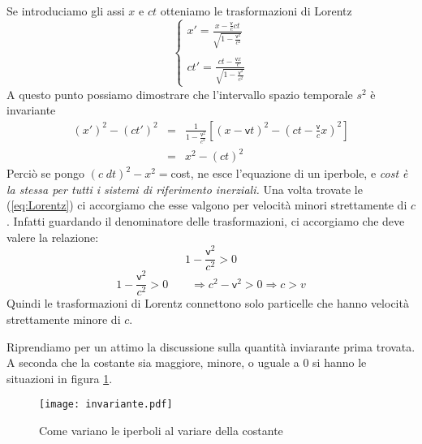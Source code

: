 Se introduciamo gli assi $x$ e $ct$ otteniamo le trasformazioni di
Lorentz 
\begin{equation}
  \left\{\begin{array}{l}
      x'=\frac{x-\frac{\mathsf{v}}{c}ct}{\sqrt{1-\frac{\mathsf{v}^2}{c^2}}}
      \\
      \mbox{ }\\
      ct'=\frac{ct-\frac{\mathsf{v}x}{c}}{\sqrt{1-\frac{\mathsf{v}^2}{c^2}}}
    \end{array}\right.\label{eq:Lorentz}
\end{equation}
A questo punto possiamo dimostrare che l'intervallo spazio temporale
$s^2$ \`e invariante
\begin{eqnarray*}
  (x')^2 - (ct')^2 & = &
  \frac{1}{1-\frac{\mathsf{v}^2}{c^2}}
  \left[(x-\mathsf{v}t)^2-(ct-\frac{\mathsf{v}}{c}x)^2\right]\\
  & = & x^2-(ct)^2
\end{eqnarray*}
Perci\`o se pongo $(c\;dt)^2-x^2=$cost, ne esce l'equazione di un
iperbole, e \emph{cost \`e la stessa per tutti i sistemi di
  riferimento inerziali.} Una volta trovate le (\ref{eq:Lorentz}) ci
accorgiamo che esse valgono per velocit\`a minori strettamente di
$c$. Infatti guardando il denominatore delle trasformazioni, ci
accorgiamo che deve valere la relazione:
\begin{displaymath}
  1-\frac{\mathsf{v}^2}{c^2}>0
\end{displaymath}
\begin{displaymath}
1-\frac{\mathsf{v}^2}{c^2}>0\qquad\Longrightarrow
c^2-\mathsf{v}^2>0\Longrightarrow c>v
\end{displaymath}
Quindi le trasformazioni di Lorentz
connettono solo particelle che hanno velocit\`a strettamente minore di
$c$.

Riprendiamo per un attimo la discussione sulla quantit\`a inviarante
prima trovata. A seconda che la costante sia maggiore, minore, o
uguale a $0$ si hanno le situazioni in figura
\ref{fig:iperboli}.\newline
\begin{figure}[tb]
  \begin{center}
      
    \texttt{[image: invariante.pdf]}
    \caption{Come variano le iperboli al variare della costante}
    \label{fig:iperboli}
  \end{center}
\end{figure}


